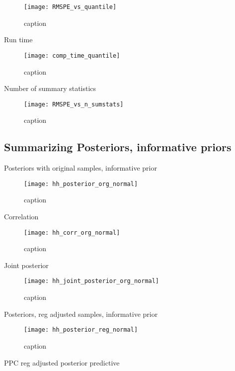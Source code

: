 \begin{figure}[H]
    \centering
    \texttt{[image: RMSPE\_vs\_quantile]}
    \caption{caption}
    \label{fig:fig1}
\end{figure} 

Run time

\begin{figure}[H]
    \centering
    \texttt{[image: comp\_time\_quantile]}
    \caption{caption}
    \label{fig:fig1}
\end{figure}


Number of summary statistics

\begin{figure}[H]
    \centering
    \texttt{[image: RMSPE\_vs\_n\_sumstats]}
    \caption{caption}
    \label{fig:fig1}
\end{figure} 


\subsection{Summarizing Posteriors, informative priors}

Posteriors with original samples, informative prior

\begin{figure}[H]
    \centering
    \texttt{[image: hh\_posterior\_org\_normal]}
    \caption{caption}
    \label{fig:fig1}
\end{figure}

Correlation

\begin{figure}[H]
    \centering
    \texttt{[image: hh\_corr\_org\_normal]}
    \caption{caption}
    \label{fig:fig1}
\end{figure}

Joint posterior 

\begin{figure}[H]
    \centering
    \texttt{[image: hh\_joint\_posterior\_org\_normal]}
    \caption{caption}
    \label{fig:fig1}
\end{figure}

Posteriors, reg adjusted samples, informative prior

\begin{figure}[H]
    \centering
    \texttt{[image: hh\_posterior\_reg\_normal]}
    \caption{caption}
    \label{fig:fig1}
\end{figure}

PPC reg adjusted posterior predictive 

